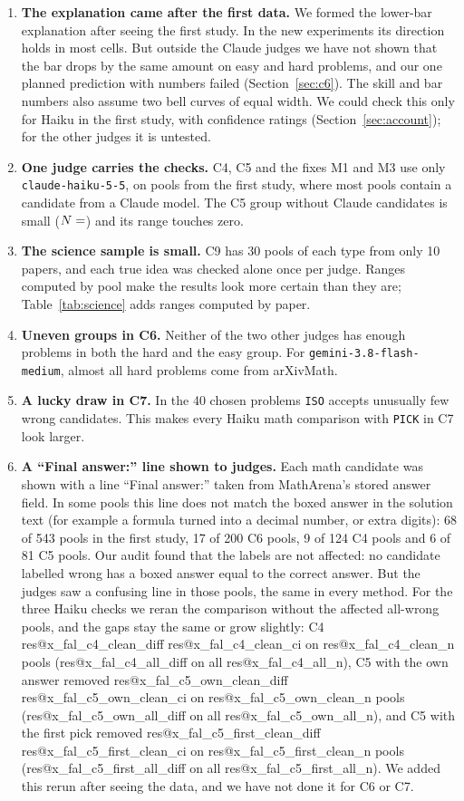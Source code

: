 \documentclass[10pt,twocolumn]{article}
\makeatletter
\newcommand{\res}[1]{\csname res@#1\endcsname}
\makeatother
\begin{document}
\begin{enumerate}\setlength{\itemsep}{2pt}
\item \textbf{The explanation came after the first data.} We formed the lower-bar explanation after seeing the first study. In the new experiments its direction holds in most cells. But outside the Claude judges we have not shown that the bar drops by the same amount on easy and hard problems, and our one planned prediction with numbers failed (Section~\ref{sec:c6}). The skill and bar numbers also assume two bell curves of equal width. We could check this only for Haiku in the first study, with confidence ratings (Section~\ref{sec:account}); for the other judges it is untested.
\item \textbf{One judge carries the checks.} C4, C5 and the fixes M1 and M3 use only \texttt{claude-haiku-5-5}, on pools from the first study, where most pools contain a candidate from a Claude model. The C5 group without Claude candidates is small ($N=\res{c5o_all_cl0_n}$) and its range touches zero.
\item \textbf{The science sample is small.} C9 has 30 pools of each type from only 10 papers, and each true idea was checked alone once per judge. Ranges computed by pool make the results look more certain than they are; Table~\ref{tab:science} adds ranges computed by paper.
\item \textbf{Uneven groups in C6.} Neither of the two other judges has enough problems in both the hard and the easy group. For \texttt{gemini-3.8-flash-medium}, almost all hard problems come from arXivMath.
\item \textbf{A lucky draw in C7.} In the 40 chosen problems \texttt{ISO} accepts unusually few wrong candidates. This makes every Haiku math comparison with \texttt{PICK} in C7 look larger.
\item \textbf{A ``Final answer:'' line shown to judges.} Each math candidate was shown with a line ``Final answer:'' taken from MathArena's stored answer field. In some pools this line does not match the boxed answer in the solution text (for example a formula turned into a decimal number, or extra digits): 68 of 543 pools in the first study, 17 of 200 C6 pools, 9 of 124 C4 pools and 6 of 81 C5 pools. Our audit found that the labels are not affected: no candidate labelled wrong has a boxed answer equal to the correct answer. But the judges saw a confusing line in those pools, the same in every method. For the three Haiku checks we reran the comparison without the affected all-wrong pools, and the gaps stay the same or grow slightly: C4 \res{x_fal_c4_clean_diff} \res{x_fal_c4_clean_ci} on \res{x_fal_c4_clean_n} pools (\res{x_fal_c4_all_diff} on all \res{x_fal_c4_all_n}), C5 with the own answer removed \res{x_fal_c5_own_clean_diff} \res{x_fal_c5_own_clean_ci} on \res{x_fal_c5_own_clean_n} pools (\res{x_fal_c5_own_all_diff} on all \res{x_fal_c5_own_all_n}), and C5 with the first pick removed \res{x_fal_c5_first_clean_diff} \res{x_fal_c5_first_clean_ci} on \res{x_fal_c5_first_clean_n} pools (\res{x_fal_c5_first_all_diff} on all \res{x_fal_c5_first_all_n}). We added this rerun after seeing the data, and we have not done it for C6 or C7.

\end{enumerate}
\end{document}
